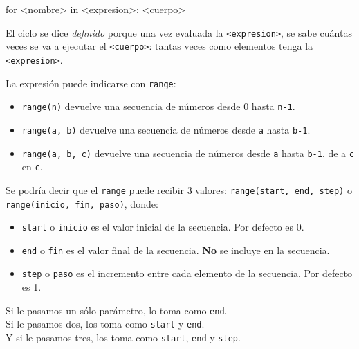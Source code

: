 \documentclass[
  letterpaper,
  DIV=11,
  numbers=noendperiod]{scrreprt}
\newenvironment{Shaded}{\begin{snugshade}}{\end{snugshade}}
\newcommand{\ControlFlowTok}[1]{\textcolor[rgb]{0.00,0.23,0.31}{#1}}
\newcommand{\KeywordTok}[1]{\textcolor[rgb]{0.00,0.23,0.31}{#1}}
\newcommand{\NormalTok}[1]{\textcolor[rgb]{0.00,0.23,0.31}{#1}}
\newcommand{\OperatorTok}[1]{\textcolor[rgb]{0.37,0.37,0.37}{#1}}
\providecommand{\tightlist}{%
  \setlength{\itemsep}{0pt}\setlength{\parskip}{0pt}}\usepackage{longtable,booktabs,array}
\begin{document}
\begin{Shaded}
\begin{Highlighting}[]
\ControlFlowTok{for} \OperatorTok{\textless{}}\NormalTok{nombre}\OperatorTok{\textgreater{}} \KeywordTok{in} \OperatorTok{\textless{}}\NormalTok{expresion}\OperatorTok{\textgreater{}}\NormalTok{:}
    \OperatorTok{\textless{}}\NormalTok{cuerpo}\OperatorTok{\textgreater{}}
\end{Highlighting}
\end{Shaded}

El ciclo se dice \emph{definido} porque una vez evaluada la
\texttt{\textless{}expresion\textgreater{}}, se sabe cuántas veces se va
a ejecutar el \texttt{\textless{}cuerpo\textgreater{}}: tantas veces
como elementos tenga la \texttt{\textless{}expresion\textgreater{}}.

La expresión puede indicarse con \texttt{range}:

\begin{itemize}
\tightlist
\item
  \texttt{range(n)} devuelve una secuencia de números desde 0 hasta
  \texttt{n-1}.
\item
  \texttt{range(a,\ b)} devuelve una secuencia de números desde
  \texttt{a} hasta \texttt{b-1}.
\item
  \texttt{range(a,\ b,\ c)} devuelve una secuencia de números desde
  \texttt{a} hasta \texttt{b-1}, de a \texttt{c} en \texttt{c}.
\end{itemize}

Se podría decir que el \texttt{range} puede recibir 3 valores:
\texttt{range(start,\ end,\ step)} o
\texttt{range(inicio,\ fin,\ paso)}, donde:

\begin{itemize}
\tightlist
\item
  \texttt{start} o \texttt{inicio} es el valor inicial de la secuencia.
  Por defecto es 0.
\item
  \texttt{end} o \texttt{fin} es el valor final de la secuencia.
  \textbf{No} se incluye en la secuencia.
\item
  \texttt{step} o \texttt{paso} es el incremento entre cada elemento de
  la secuencia. Por defecto es 1.
\end{itemize}

Si le pasamos un sólo parámetro, lo toma como \texttt{end}.\\
Si le pasamos dos, los toma como \texttt{start} y \texttt{end}.\\
Y si le pasamos tres, los toma como \texttt{start}, \texttt{end} y
\texttt{step}.
\end{document}
